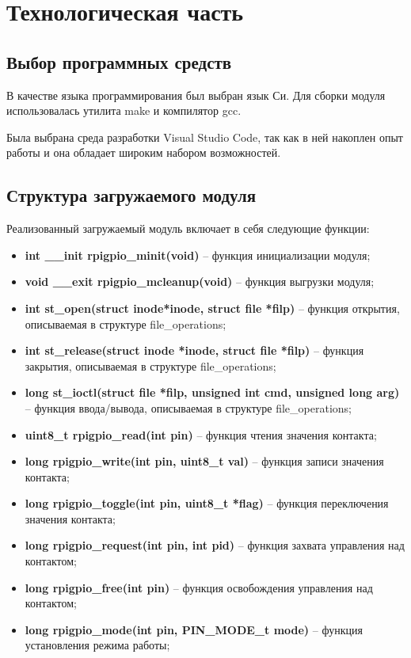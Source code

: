 \section{Технологическая часть}

\subsection{Выбор программных средств}
В качестве языка программирования был выбран язык Си. Для сборки модуля использовалась утилита make и компилятор gcc.

Была выбрана среда разработки Visual Studio Code, так как в ней накоплен опыт работы и она обладает широким набором возможностей.

\subsection{Структура загружаемого модуля}

Реализованный загружаемый модуль включает в себя следующие функции:
\begin{itemize}
	\item \textbf{int \_\_init rpigpio\_minit(void)} -- функция инициализации модуля;
	\item \textbf{void \_\_exit rpigpio\_mcleanup(void)} -- функция выгрузки модуля;
	
	\item \textbf{int st\_open(struct inode*inode, struct file *filp)} -- функция открытия, описываемая в структуре file\_operations;
	\item \textbf{int st\_release(struct inode *inode, struct file *filp)} -- функция закрытия, описываемая в структуре file\_operations;
	\item \textbf{long st\_ioctl(struct file *filp, unsigned int cmd, unsigned long arg)} -- функция ввода/вывода, описываемая в структуре file\_operations;
	
	\item \textbf{uint8\_t rpigpio\_read(int pin)} -- функция чтения значения контакта;
	\item \textbf{long rpigpio\_write(int pin, uint8\_t val)} -- функция записи значения контакта;
	\item \textbf{long rpigpio\_toggle(int pin, uint8\_t *flag)} -- функция переключения значения контакта;
	
	\item \textbf{long rpigpio\_request(int pin, int pid)} -- функция захвата управления над контактом;
	\item \textbf{long rpigpio\_free(int pin)} -- функция освобождения управления над контактом;
	
	\item \textbf{long rpigpio\_mode(int pin, PIN\_MODE\_t mode)} -- функция установления режима работы;
\end{itemize}

